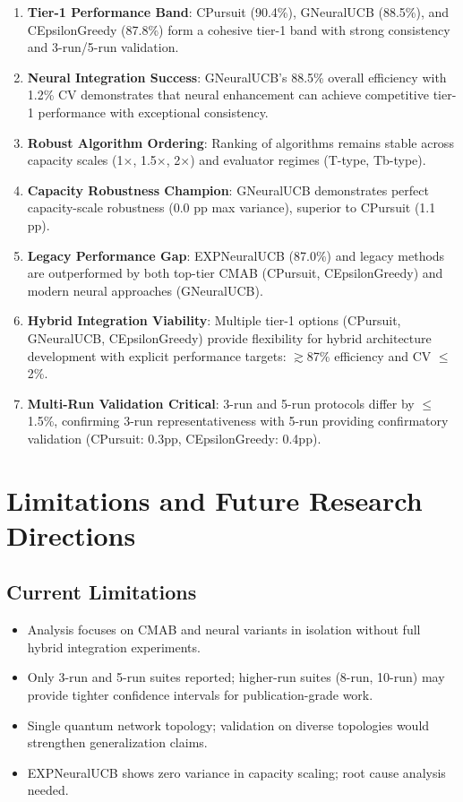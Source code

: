 \documentclass[12pt,a4paper]{article}
\newcommand{\legacy}[1]{\textcolor{legacycolor}{\textbf{#1}}}
\newcommand{\neural}[1]{\textcolor{neuralcolor}{\textbf{#1}}}
\begin{document}
\begin{enumerate}
\item \textbf{Tier-1 Performance Band}: CPursuit (90.4\%), GNeuralUCB (88.5\%), and CEpsilonGreedy (87.8\%) form a cohesive tier-1 band with strong consistency and 3-run/5-run validation.
\item \neural{Neural Integration Success}: GNeuralUCB's 88.5\% overall efficiency with 1.2\% CV demonstrates that neural enhancement can achieve competitive tier-1 performance with exceptional consistency.
\item \textbf{Robust Algorithm Ordering}: Ranking of algorithms remains stable across capacity scales (1$\times$, 1.5$\times$, 2$\times$) and evaluator regimes (T-type, Tb-type).
\item \neural{Capacity Robustness Champion}: GNeuralUCB demonstrates perfect capacity-scale robustness (0.0 pp max variance), superior to CPursuit (1.1 pp).
\item \legacy{Legacy Performance Gap}: EXPNeuralUCB (87.0\%) and legacy methods are outperformed by both top-tier CMAB (CPursuit, CEpsilonGreedy) and modern neural approaches (GNeuralUCB).
\item \textbf{Hybrid Integration Viability}: Multiple tier-1 options (CPursuit, GNeuralUCB, CEpsilonGreedy) provide flexibility for hybrid architecture development with explicit performance targets: $\gtrsim$87\% efficiency and CV $\leq$2\%.
\item \textbf{Multi-Run Validation Critical}: 3-run and 5-run protocols differ by $\leq$1.5\%, confirming 3-run representativeness with 5-run providing confirmatory validation (CPursuit: 0.3pp, CEpsilonGreedy: 0.4pp).
\end{enumerate}

\section{Limitations and Future Research Directions}

\subsection{Current Limitations}

\begin{itemize}
\item Analysis focuses on CMAB and neural variants in isolation without full hybrid integration experiments.
\item Only 3-run and 5-run suites reported; higher-run suites (8-run, 10-run) may provide tighter confidence intervals for publication-grade work.
\item Single quantum network topology; validation on diverse topologies would strengthen generalization claims.
\item EXPNeuralUCB shows zero variance in capacity scaling; root cause analysis needed.
\end{itemize}
\end{document}
